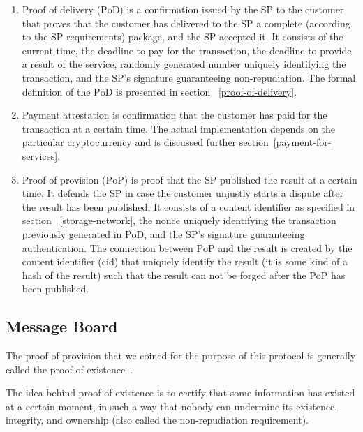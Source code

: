 \documentclass{ieeeaccess}
\begin{document}
\begin{enumerate}
    \item Proof of delivery ($\mathrm{PoD}$) is a confirmation issued by the SP to the customer that proves that the customer has delivered to the SP a complete (according to the SP requirements) package, and the SP accepted it. It consists of the current time, the deadline to pay for the transaction, the deadline to provide a result of the service, randomly generated number uniquely identifying the transaction, and the SP's signature guaranteeing non-repudiation. The formal definition of the $\mathrm{PoD}$ is presented in section ~\ref{proof-of-delivery}.
    
    \item Payment $\mathrm{attestation}$ is confirmation that the customer has paid for the transaction at a certain time. The actual implementation depends on the particular cryptocurrency and is discussed further section~\ref{payment-for-services}.
    
    \item Proof of provision ($\mathrm{PoP}$) is proof that the SP published the result at a certain time. It defends the SP in case the customer unjustly starts a dispute after the result has been published. It consists of a content identifier as specified in section ~\ref{storage-network}, the $\mathrm{nonce}$ uniquely identifying the transaction previously generated in $\mathrm{PoD}$, and the SP's signature guaranteeing authentication. The connection between $\mathrm{PoP}$ and the result is created by the content identifier ($\mathrm{cid}$) that uniquely identify the result (it is some kind of a hash of the result) such that the result can not be forged after the $\mathrm{PoP}$ has been published.
\end{enumerate}

\subsection{Message Board}\label{sec:message-board}
The proof of provision that we coined for the purpose of this protocol is generally called the proof of existence~\cite{ProofExistenceOnline, crespoStamperyBlockchainTimestamping2017, ChainpointBlockchainProof}.

The idea behind proof of existence is to certify that some information
has existed at a certain moment, in such a way that nobody can
undermine its existence, integrity, and ownership (also called the
non-repudiation requirement).
\end{document}
